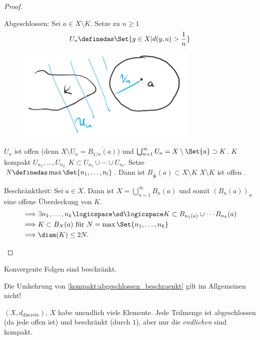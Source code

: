 \begin{proof}
    \begin{proofdescription}
        \item[Abgeschlossen:] Sei \( a\in X\setminus K\). Setze zu \( n\geq 1\)
        \begin{align*}
            U_n\definedas \Set{y\in X| d(y,a)>\frac{1}{n}}
        \end{align*}  
        \begin{figure}[H]
            \centering
            \includegraphics[width=0.5\linewidth]{figures/kompakt_abgeschlossen_beweis}
            \label{fig:kompakt_abgeschlossen_beweis}
        \end{figure}
        \( U_n\) ist offen (denn \( X\setminus U_n=\overline{B_{1/n}(a)}\)) und \( \bigcup_{n=1}^{\infty}U_n=X\setminus \Set{a}\supset K\).
        \( K\) kompakt \timplies \texists \( U_{n_1},\ldots, U_{n_L}\) \sd \( K\subset U_{n_1}\cup \cdots \cup U_{n_l}\). Setze \( N\definedas \max\Set{n_1,\ldots,n_l}\). Dann ist \( B_{\frac{1}{N}}(a)\subset X\setminus K\) \timplies \( X\setminus K \) ist offen \timplies \Beh.
        
        \item[Beschränktheit:] Sei \( a\in X\). Dann ist \( X=\bigcup\limits_{n=1}^{\infty} B_n(a) \) und somit \( (B_n(a))_n\) eine offene Überdeckung von \( K\).
        \begin{align*}
            \implies &\exists n_1,\ldots, n_k\logicspace  \sd\logicspace  K\subset B_{n_1(a)}\cup \cdots B_{n_k}(a)\\
            \implies &K\subset B_N(a) \text{ für }N=\max\Set{n_1,\ldots,n_k}\\
            \implies &\diam(K)\leq 2N.
        \end{align*}     
    \end{proofdescription}    
\end{proof}
\begin{folgerung*}
    Konvergente Folgen sind beschränkt.
\end{folgerung*}
\begin{bemerkung*}
    Die Umkehrung von \ref{kompakt:abgeschlossen_beschraenkt} gilt im Allgemeinen nicht!
    
    \( (X,d_{\text{discrete}})\), \( X\) habe unendlich viele Elemente. Jede Teilmenge ist abgeschlossen (da jede offen ist) und beschränkt (durch \( 1\)), aber nur die \emph{endlichen} sind kompakt.
\end{bemerkung*}
